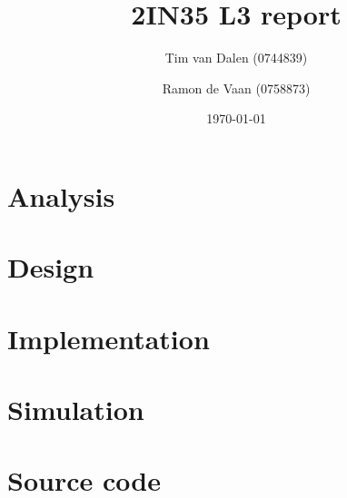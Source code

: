 \documentclass[a4paper,11pt]{article}
\title{
	2IN35 L3 report
}
\author{
	Tim van Dalen (0744839)
	\and
	Ramon de Vaan (0758873)
}
\date{\today}
\begin{document}
	\maketitle

	\section{Analysis}
	

	\section{Design}
	

	\section{Implementation}
	

	\section{Simulation}
	

	\appendix
	\section{Source code}
	
\end{document}
